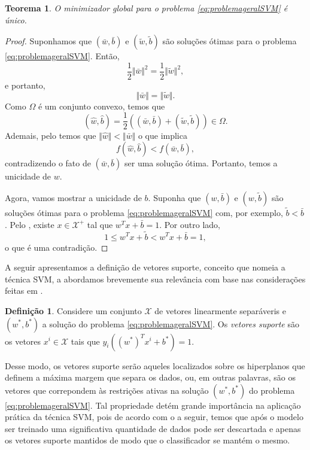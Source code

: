 \documentclass[12pt,a4paper]{scrartcl}
\def\Xset{\mathcal{X}}
\newtheorem{teo}{Teorema}
\theoremstyle{definition}%
\newtheorem{defi}{Definição}
\begin{document}
\begin{teo} \label{teo:unicidade_solucao_problema_SVM_margem_rigida}
O minimizador global para o problema \eqref{eq:problemageralSVM} é único.
\end{teo}
\begin{proof}
Suponhamos que $(\bar{w}, \bar{b})$ e $(\tilde{w}, \tilde{b})$ são soluções ótimas para o problema \eqref{eq:problemageralSVM}. Então, 
\[
\dfrac{1}{2}\Vert \bar{w} \Vert^{2} = \dfrac{1}{2}\Vert \tilde{w} \Vert^{2},
\]
e portanto, 
\[
\Vert \bar{w} \Vert = \Vert \tilde{w} \Vert .
\]
Como $\Omega$ é um conjunto convexo, temos que
\[
(\hat{w}, \hat{b}) = \dfrac{1}{2}((\bar{w}, \bar{b}) + (\tilde{w}, \tilde{b})) \in \Omega .
\]
Ademais, pelo  temos que $\Vert \hat{w} \Vert < \Vert \bar{w} \Vert$ o que implica 
\[
f(\hat{w}, \hat{b}) < f(\bar{w}, \bar{b}),
\]
contradizendo o fato de $(\bar{w}, \bar{b})$ ser uma solução ótima. Portanto, temos a unicidade de $w$.

Agora, vamos mostrar a unicidade de $b$. Suponha que $(w, \bar{b})$ e $(w, \tilde{b})$ são soluções ótimas para o problema \eqref{eq:problemageralSVM} com, por exemplo, $\tilde{b} < \bar{b}$. Pelo , existe $x \in \Xset^{+}$ tal que $w^{T}x + \bar{b} = 1$. Por outro lado, 
\[
1 \leq w^{T}x + \tilde{b} < w^{T}x + \bar{b} = 1,
\]
o que é uma contradição.
\end{proof}

A seguir apresentamos a definição de vetores suporte, conceito que nomeia a técnica SVM, a abordamos brevemente sua relevância com base nas considerações feitas em \cite{Evelin2017,bishop2016pattern}.

\begin{defi} \label{defi:vetores_suporte}
Considere um conjunto $\Xset$ de vetores linearmente separáveris e $(w^{*}, b^{*})$ a solução do problema \eqref{eq:problemageralSVM}. Os \emph{vetores suporte} são os vetores $x^{i} \in \Xset$ tais que $y_{i}((w^{*})^{T} x^{i} + b^{*}) = 1$.
\end{defi}

Desse modo, os vetores suporte serão aqueles localizados sobre os hiperplanos que definem a máxima margem que separa os dados, ou, em outras palavras, são os vetores que correpondem às restrições ativas na solução $(w^{*}, b^{*})$ do problema \eqref{eq:problemageralSVM}. Tal propriedade detém grande importância na aplicação prática da técnica SVM, pois de acordo com o  a seguir, temos que após o modelo ser treinado uma significativa quantidade de dados pode ser descartada e apenas os vetores suporte mantidos de modo que o classificador se mantém o mesmo. 
\end{document}
